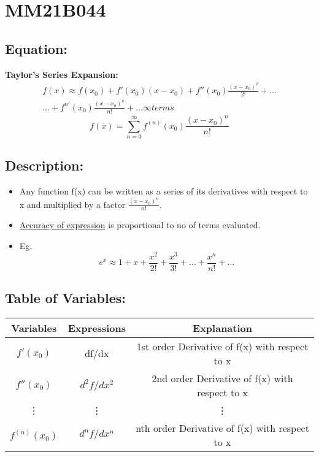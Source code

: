\section{MM21B044}

\subsection{Equation:}
\textbf{Taylor's Series Expansion:}
\begin{multline}
    f(x) \approx f(x_0)+f'(x_0)(x-x_0)+f''(x_0) \frac{(x-x_0)^2}{2!}+...\\
    ...+f^{n'}(x_0) \frac{(x-x_0)^n}{n!}+...  \infty terms
\end{multline}
\[f(x) = \sum_{n=0}^{\infty} f^{(n)}(x_0)\frac{(x-x_0)^n}{n!}\]
\subsection{Description:}
\begin{itemize}
    \item Any function f(x) can be written as a series of its derivatives with respect to x and multiplied by a factor $\frac{(x-x_0)^n}{n!}$.
    \item \underline{Accuracy of expression} is proportional to no of terms evaluated.
    \item Eg.\[e^x \approx 1+x+\frac{x^2}{2!}+\frac{x^3}{3!}+\hdots+\frac{x^n}{n!}+\hdots\]
\end{itemize}
\subsection{Table of Variables:}
\begin{tabular}{|c|c|c|}
     \hline
     \textbf{Variables} & \textbf{Expressions} & \textbf{Explanation} \\ \hline
     $f'(x_0)$ & df/dx & 1st order Derivative of f(x) with respect to x \\ \hline
     $f''(x_0)$ & $d^2f/dx^2$ & 2nd order Derivative of f(x) with respect to x \\ \hline
     \vdots & \vdots & \vdots \\ \hline
     $f^{(n)}(x_0)$ & $d^nf/dx^n$ & nth order Derivative of f(x) with respect to x \\ \hline
\end{tabular}
